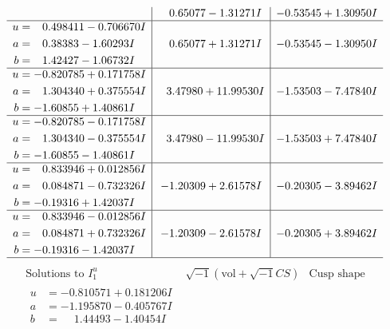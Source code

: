 \documentclass[1p]{elsarticle_modified}
\theoremstyle{definition}
\newcommand{\I}{\sqrt{-1}}
\begin{document}
$$\begin{array}{c|c|c}
 & \phantom{-}0.65077 - 1.31271 I & -0.53545 + 1.30950 I \\ \hline\begin{aligned}
u &= \phantom{-}0.498411 - 0.706670 I \\
a &= \phantom{-}0.38383 - 1.60293 I \\
b &= \phantom{-}1.42427 - 1.06732 I\end{aligned}
 & \phantom{-}0.65077 + 1.31271 I & -0.53545 - 1.30950 I \\ \hline\begin{aligned}
u &= -0.820785 + 0.171758 I \\
a &= \phantom{-}1.304340 + 0.375554 I \\
b &= -1.60855 + 1.40861 I\end{aligned}
 & \phantom{-}3.47980 + 11.99530 I & -1.53503 - 7.47840 I \\ \hline\begin{aligned}
u &= -0.820785 - 0.171758 I \\
a &= \phantom{-}1.304340 - 0.375554 I \\
b &= -1.60855 - 1.40861 I\end{aligned}
 & \phantom{-}3.47980 - 11.99530 I & -1.53503 + 7.47840 I \\ \hline\begin{aligned}
u &= \phantom{-}0.833946 + 0.012856 I \\
a &= \phantom{-}0.084871 - 0.732326 I \\
b &= -0.19316 + 1.42037 I\end{aligned}
 & -1.20309 + 2.61578 I & -0.20305 - 3.89462 I \\ \hline\begin{aligned}
u &= \phantom{-}0.833946 - 0.012856 I \\
a &= \phantom{-}0.084871 + 0.732326 I \\
b &= -0.19316 - 1.42037 I\end{aligned}
 & -1.20309 - 2.61578 I & -0.20305 + 3.89462 I\\
 \hline 
 \end{array}$$\newpage$$\begin{array}{c|c|c}  
\text{Solutions to }I^u_{1}& \I (\text{vol} + \sqrt{-1}CS) & \text{Cusp shape}\\
 \hline 
\begin{aligned}
u &= -0.810571 + 0.181206 I \\
a &= -1.195870 - 0.405767 I \\
b &= \phantom{-}1.44493 - 1.40454 I\end{aligned}

\end{array}$$
\end{document}
